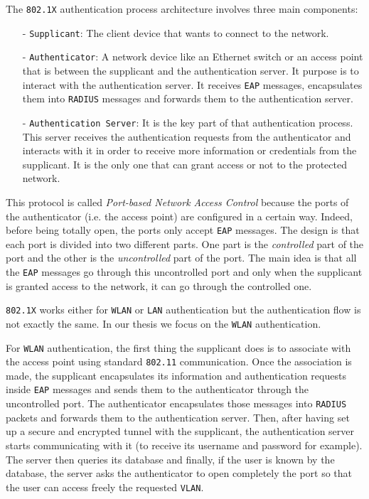 The \texttt{802.1X} authentication process architecture involves three main components:
\begin{itemize}
	\item[-]\texttt{Supplicant}: The client device that wants to connect to the network.
	\item[-]\texttt{Authenticator}: A network device like an Ethernet switch or an access point that is between the supplicant and the authentication server. It purpose is to interact with the authentication server. It receives \texttt{EAP} messages, encapsulates them into \texttt{RADIUS} messages and forwards them to the authentication server.
	\item[-]\texttt{Authentication Server}: It is the key part of that authentication process. This server receives the authentication requests from the authenticator and interacts with it in order to receive more information or credentials from the supplicant. It is the only one that can grant access or not to the protected network.
\end{itemize} 

This protocol is called \textit{Port-based Network Access Control} because the ports of the authenticator (i.e. the access point) are configured in a certain way. Indeed, before being totally open, the ports only accept \texttt{EAP} messages. The design is that each port is divided into two different parts. One part is the \textit{controlled} part of the port and the other is the \textit{uncontrolled} part of the port. The main idea is that all the \texttt{EAP} messages go through this uncontrolled port and only when the supplicant is granted access to the network, it can go through the controlled one.

\texttt{802.1X} works either for \texttt{WLAN} or \texttt{LAN} authentication but the authentication flow is not exactly the same. In our thesis we focus on the \texttt{WLAN} authentication.

For \texttt{WLAN} authentication, the first thing the supplicant does is to associate with the access point using standard \texttt{802.11} communication. Once the association is made, the supplicant encapsulates its information and authentication requests inside \texttt{EAP} messages and sends them to the authenticator through the uncontrolled port. The authenticator encapsulates those messages into \texttt{RADIUS} packets and forwards them to the authentication server. Then, after having set up a secure and encrypted tunnel with the supplicant, the authentication server starts communicating with it (to receive its username and password for example). The server then queries its database and finally, if the user is known by the database, the server asks the authenticator to open completely the port so that the user can access freely the requested \texttt{VLAN}.

